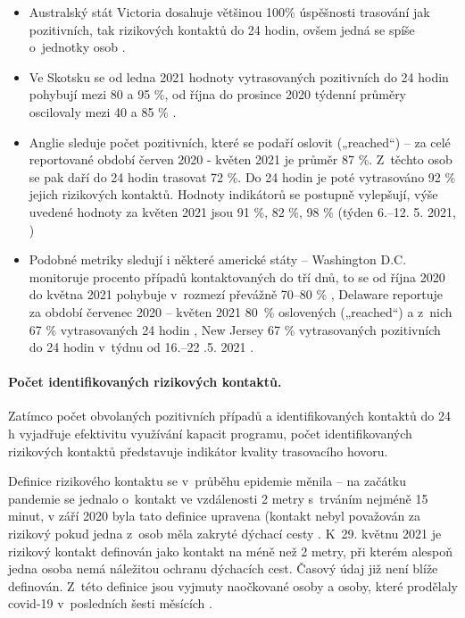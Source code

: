 \begin{itemize}
\item Australský stát Victoria dosahuje většinou 100\% úspěšnosti trasování jak pozitivních, tak rizikových kontaktů do 24 hodin, ovšem jedná se spíše o~jednotky osob \cite{tr_victoria}.
\item Ve Skotsku se od ledna 2021 hodnoty vytrasovaných pozitivních do 24 hodin pohybují mezi 80 a 95 \%, od října do prosince 2020 týdenní průměry oscilovaly mezi 40 a 85 \% \cite{tr_scotland}.
\item Anglie sleduje počet pozitivních, které se podaří oslovit („reached“) -- za celé reportované období červen 2020 - květen 2021 je průměr 87 \%. Z~těchto osob se pak daří do 24 hodin trasovat 72 \%. Do 24 hodin je poté vytrasováno 92 \% jejich rizikových kontaktů. Hodnoty indikátorů se postupně vylepšují, výše uvedené hodnoty za květen 2021 jsou 91 \%, 82 \%, 98 \% (týden 6.--12. 5. 2021, \cite{tr_gov_uk})
\item Podobné metriky sledují i některé americké státy -- Washington D.C. monitoruje procento případů kontaktovaných do tří dnů, to se od října 2020 do května 2021 pohybuje v~rozmezí převážně 70--80 \% \cite{tr_DC}, Delaware reportuje za období červenec 2020 -- květen 2021 80~\% oslovených („reached“) a z~nich 67 \% vytrasovaných 24 hodin \cite{tr_Delaware}, New Jersey 67 \% vytrasovaných pozitivních do 24 hodin v~týdnu od 16.--22 .5. 2021 \cite{tr_NewJersey}.
\end{itemize}


\paragraph{Počet identifikovaných rizikových kontaktů.} Zatímco počet obvolaných pozitivních případů a identifikovaných kontaktů do 24 h vyjadřuje efektivitu využívání kapacit programu, počet identifikovaných rizikových kontaktů představuje indikátor kvality trasovacího hovoru.

Definice rizikového kontaktu se v~průběhu epidemie měnila -- na začátku pandemie se jednalo o~kontakt ve vzdálenosti 2 metry s~trváním nejméně 15 minut, v září 2020 byla tato definice upravena (kontakt nebyl považován za rizikový pokud jedna z~osob měla zakryté dýchací cesty \cite{tr_MZCR}. K~29. květnu 2021 je rizikový kontakt definován jako kontakt na méně než 2 metry, při kterém alespoň jedna osoba nemá náležitou ochranu dýchacích cest. Časový údaj již není blíže definován. Z~této definice jsou vyjmuty naočkované osoby a osoby, které prodělaly covid-19 v~posledních šesti měsících \cite{tr_covidgov}.

